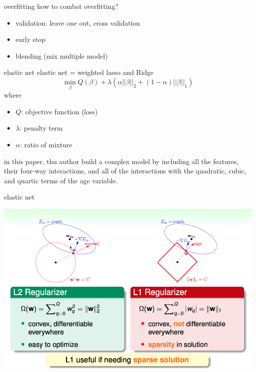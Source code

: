 \documentclass[
  ignorenonframetext,
]{beamer}
\begin{document}
\begin{frame}{overfitting}
  how to combat overfitting? 
  \begin{itemize}
    \item validation: leave one out, cross validation
    \item early stop
    \item blending (mix multiple model)
  \end{itemize}
\end{frame}


\begin{frame}{elastic net}
  elastic net = weighted lasso and Ridge
  $$
  \min_{\beta} Q(\beta) + \lambda(\alpha||\beta||_2 + (1-\alpha)||\beta||_1)
  $$
  where 
  \begin{itemize}
    \item $Q$: objective function (loss)
    \item $\lambda$: penalty term 
    \item $\alpha$: ratio of mixture
  \end{itemize}

 \vspace{0.5cm} 
  in this paper, thu author build a complex model by including all the features,
  their four-way interactions, and all of the interactions with the quadratic, cubic, and quartic terms of the age variable.
\end{frame}


\begin{frame}{elastic net}
  \begin{center}
    \includegraphics{figure/pdf/regularizer.png}
  \end{center}
\end{frame}
\end{document}
